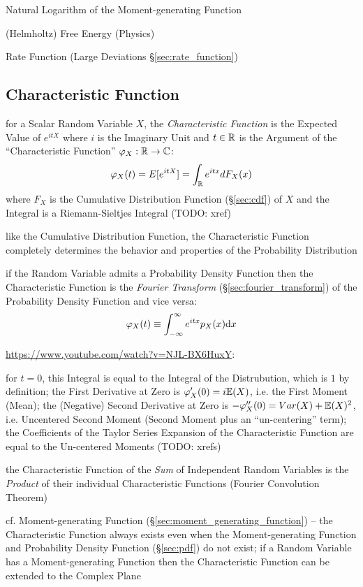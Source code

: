 Natural Logarithm of the Moment-generating Function

(Helmholtz) Free Energy (Physics)

Rate Function (Large Deviations \S\ref{sec:rate_function})



\subsection{Characteristic Function}\label{sec:characteristic_function}

for a Scalar Random Variable $X$, the \emph{Characteristic Function} is the
Expected Value of $e^{itX}$ where $i$ is the Imaginary Unit and $t \in \mathbb{R}$
is the Argument of the ``Characteristic Function''
$\varphi_X : \mathbb{R} \to \mathbb{C}$:
\[
  \varphi_X(t) = E[e^{itX}] = \int_{\mathbb{R}} e^{itx} dF_X(x)
\]
where $F_X$ is the Cumulative Distribution Function (\S\ref{sec:cdf}) of $X$ and
the Integral is a Riemann-Sieltjes Integral (TODO: xref)

like the Cumulative Distribution Function, the Characteristic Function
completely determines the behavior and properties of the Probability
Distribution

if the Random Variable admits a Probability Density Function then the
Characteristic Function is the \emph{Fourier Transform}
(\S\ref{sec:fourier_transform}) of the Probability Density Function and vice
versa:
\[
  \varphi_X(t) \equiv \int_{-\infty}^\infty e^{itx} p_X(x) \mathrm{d}x
\]

\url{https://www.youtube.com/watch?v=NJL-BX6HuxY}:

for $t = 0$, this Integral is equal to the Integral of the Distrubution, which
is $1$ by definition; the First Derivative at Zero is
$\varphi'_X(0) = i \mathbb{E}(X)$, i.e. the First Moment (Mean); the (Negative)
Second Derivative at Zero is $-\varphi''_X(0) = Var(X) + \mathbb{E}(X)^2$, i.e.
Uncentered Second Moment (Second Moment plus an ``un-centering'' term); the
Coefficients of the Taylor Series Expansion of the Characteristic Function are
equal to the Un-centered Moments (TODO: xrefs)

the Characteristic Function of the \emph{Sum} of Independent Random Variables is
the \emph{Product} of their individual Characteristic Functions (Fourier
Convolution Theorem)

cf. Moment-generating Function (\S\ref{sec:moment_generating_function}) --
the Characteristic Function always exists even when the Moment-generating
Function and Probability Density Function (\S\ref{sec:pdf}) do not exist;
if a Random Variable has a Moment-generating Function then the Characteristic
Function can be extended to the Complex Plane


